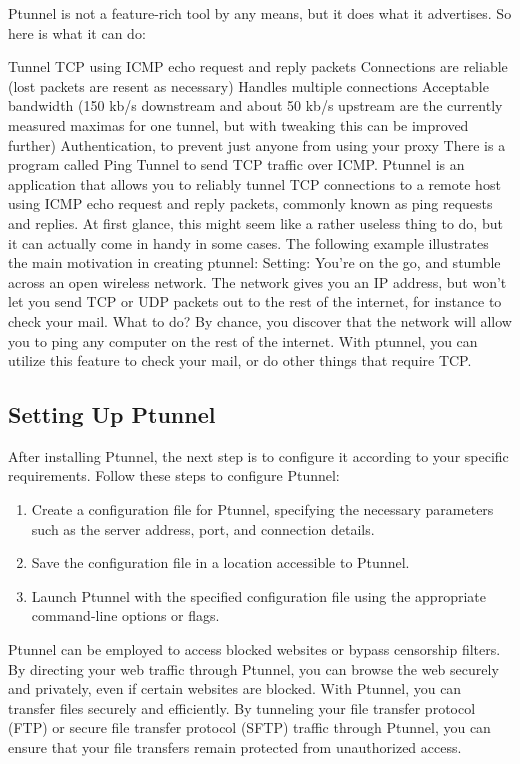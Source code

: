 Ptunnel is not a feature-rich tool by any means, but it does what it advertises. So here is what it can do:

Tunnel TCP using ICMP echo request and reply packets
Connections are reliable (lost packets are resent as necessary)
Handles multiple connections
Acceptable bandwidth (150 kb/s downstream and about 50 kb/s upstream are the currently measured maximas for one tunnel, but with tweaking this can be improved further)
Authentication, to prevent just anyone from using your proxy
%
There is a program called Ping Tunnel to send TCP traffic over ICMP.
Ptunnel is an application that allows you to reliably tunnel TCP connections to a remote host using ICMP echo request and reply packets, commonly known as ping requests and replies. At first glance, this might seem like a rather useless thing to do, but it can actually come in handy in some cases. The following example illustrates the main motivation in creating ptunnel:
%
Setting: You’re on the go, and stumble across an open wireless network. The network gives you an IP address, but won’t let you send TCP or UDP packets out to the rest of the internet, for instance to check your mail. What to do? By chance, you discover that the network will allow you to ping any computer on the rest of the internet. With ptunnel, you can utilize this feature to check your mail, or do other things that require TCP.


%
\subsection{Setting Up Ptunnel}
After installing Ptunnel, the next step is to configure it according to your specific requirements. Follow these steps to configure Ptunnel:
\begin{enumerate}
    \item Create a configuration file for Ptunnel, specifying the necessary parameters such as the server address, port, and connection details.
    \item Save the configuration file in a location accessible to Ptunnel.
    \item Launch Ptunnel with the specified configuration file using the appropriate command-line options or flags.
\end{enumerate}
%
Ptunnel can be employed to access blocked websites or bypass censorship filters. By directing your web traffic through Ptunnel, you can browse the web securely and privately, even if certain websites are blocked.
%
With Ptunnel, you can transfer files securely and efficiently. By tunneling your file transfer protocol (FTP) or secure file transfer protocol (SFTP) traffic through Ptunnel, you can ensure that your file transfers remain protected from unauthorized access.

